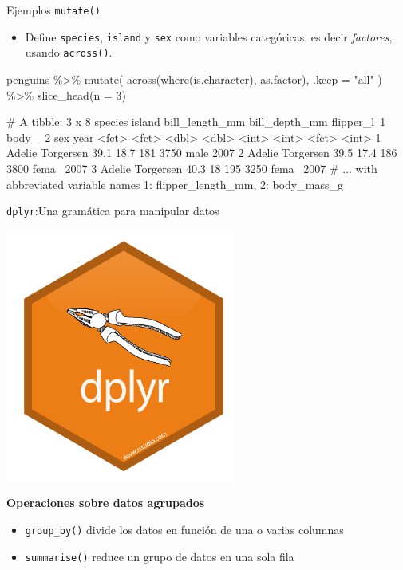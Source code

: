 \documentclass[
  ignorenonframetext,
  aspectratio=169]{beamer}
\newenvironment{Shaded}{\begin{snugshade}}{\end{snugshade}}
\newcommand{\AttributeTok}[1]{\textcolor[rgb]{0.77,0.63,0.00}{#1}}
\newcommand{\DecValTok}[1]{\textcolor[rgb]{0.00,0.00,0.81}{#1}}
\newcommand{\FunctionTok}[1]{\textcolor[rgb]{0.00,0.00,0.00}{#1}}
\newcommand{\NormalTok}[1]{#1}
\newcommand{\SpecialCharTok}[1]{\textcolor[rgb]{0.00,0.00,0.00}{#1}}
\newcommand{\StringTok}[1]{\textcolor[rgb]{0.31,0.60,0.02}{#1}}
\providecommand{\tightlist}{%
  \setlength{\itemsep}{0pt}\setlength{\parskip}{0pt}}
\let\oldverbatim\verbatim
\let\endoldverbatim\endverbatim
\renewenvironment{verbatim}{\tiny\oldverbatim}{\endoldverbatim}
\begin{document}
\begin{frame}[fragile]{Ejemplos \texttt{mutate()}}
\protect\hypertarget{ejemplos-mutate-5}{}
\begin{itemize}
\tightlist
\item
  Define \texttt{species}, \texttt{island} y \texttt{sex} como variables
  categóricas, es decir \emph{factores}, usando \texttt{across()}.\\
\end{itemize}

\begin{Shaded}
\begin{Highlighting}[]
\NormalTok{penguins }\SpecialCharTok{\%\textgreater{}\%} 
  \FunctionTok{mutate}\NormalTok{(}
    \FunctionTok{across}\NormalTok{(}\FunctionTok{where}\NormalTok{(is.character), as.factor),}
    \AttributeTok{.keep =} \StringTok{"all"}
\NormalTok{  ) }\SpecialCharTok{\%\textgreater{}\%} 
  \FunctionTok{slice\_head}\NormalTok{(}\AttributeTok{n =} \DecValTok{3}\NormalTok{)}
\end{Highlighting}
\end{Shaded}

\begin{verbatim}
# A tibble: 3 x 8
  species island    bill_length_mm bill_depth_mm flipper_l~1 body_~2 sex    year
  <fct>   <fct>              <dbl>         <dbl>       <int>   <int> <fct> <int>
1 Adelie  Torgersen           39.1          18.7         181    3750 male   2007
2 Adelie  Torgersen           39.5          17.4         186    3800 fema~  2007
3 Adelie  Torgersen           40.3          18           195    3250 fema~  2007
# ... with abbreviated variable names 1: flipper_length_mm, 2: body_mass_g
\end{verbatim}
\end{frame}

\begin{frame}[fragile]{\texttt{dplyr}:Una gramática para manipular
datos}
\protect\hypertarget{dplyruna-gramuxe1tica-para-manipular-datos}{}
\begin{flushright}\includegraphics[width=0.1\linewidth]{Imgs/logo_dplyr} \end{flushright}

\textbf{Operaciones sobre datos agrupados}

\begin{itemize}
\item
  \texttt{group\_by()} divide los datos en función de una o varias
  columnas
\item
  \texttt{summarise()} reduce un grupo de datos en una sola fila
\end{itemize}
\end{frame}
\end{document}
